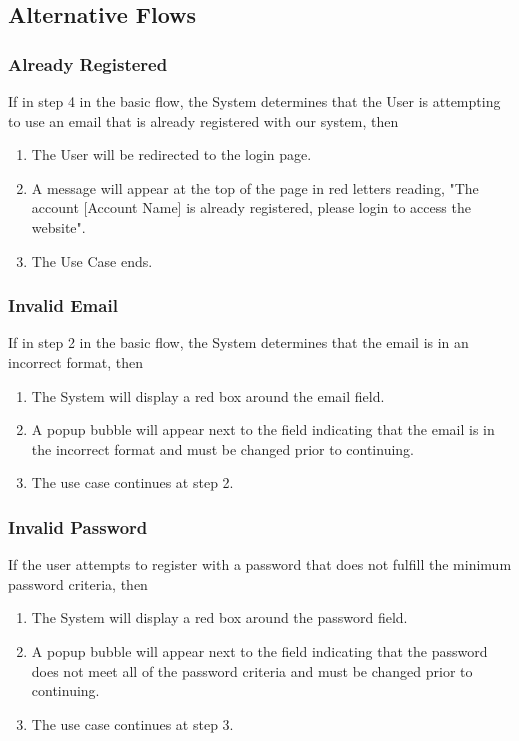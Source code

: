 \documentclass[a4paper,11pt]{article}
\begin{document}
\subsection{Alternative Flows}
\subsubsection{Already Registered}
If in step 4 in the basic flow, the System determines that the User is attempting to use an email that is already registered with our system, then
\begin{enumerate}
\item The User will be redirected to the login page.
\item A message will appear at the top of the page in red letters reading, "The account [Account Name] is already registered, please login to access the website".
\item The Use Case ends.
\end{enumerate}

\subsubsection{Invalid Email}
If in step 2 in the basic flow, the System determines that the email is in an incorrect format, then
\begin{enumerate}
\item The System will display a red box around the email field.
\item A popup bubble will appear next to the field indicating that the email is in the incorrect format and must be changed prior to continuing.
\item The use case continues at step 2.
\end{enumerate}

\subsubsection{Invalid Password}
If the user attempts to register with a password that does not fulfill the minimum password criteria, then
\begin{enumerate}
\item The System will display a red box around the password field.
\item A popup bubble will appear next to the field indicating that the password does not meet all of the password criteria and must be changed prior to continuing.
\item The use case continues at step 3.
\end{enumerate}
\end{document}
